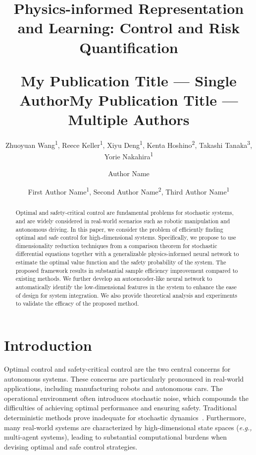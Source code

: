 \documentclass[letterpaper]{article} %
\title{



Physics-informed Representation and Learning: Control and Risk Quantification
}
\author{
    Zhuoyuan Wang\textsuperscript{\rm 1},
    Reece Keller\textsuperscript{\rm 1},
    Xiyu Deng\textsuperscript{\rm 1}, Kenta Hoshino\textsuperscript{\rm 2}, Takashi Tanaka\textsuperscript{\rm 3}, Yorie Nakahira\textsuperscript{\rm 1}
}
\title{My Publication Title --- Single Author}
\author {
    Author Name
}
\title{My Publication Title --- Multiple Authors}
\author {
    First Author Name\textsuperscript{\rm 1},
    Second Author Name\textsuperscript{\rm 2},
    Third Author Name\textsuperscript{\rm 1}
}
\newcommand{\eg}{\textit{e.g., }}
\begin{document}
\maketitle

\begin{abstract}
Optimal and safety-critical control are fundamental problems for stochastic systems, and are widely considered in real-world scenarios such as robotic manipulation and autonomous driving. In this paper, we consider the problem of efficiently finding optimal and safe control for high-dimensional systems. Specifically, we propose to use dimensionality reduction techniques from a comparison theorem for stochastic differential equations together with a generalizable physics-informed neural network to estimate the optimal value function and the safety probability of the system. The proposed framework results in substantial sample efficiency improvement compared to existing methods. We further develop an autoencoder-like neural network to automatically identify the low-dimensional features in the system to enhance the ease of design for system integration. We also provide theoretical analysis and experiments to validate the efficacy of the proposed method.

\end{abstract}

\section{Introduction}

Optimal control and safety-critical control are the two central concerns for autonomous systems.
These concerns are particularly pronounced in real-world applications, including manufacturing robots and autonomous cars.
The operational environment often introduces stochastic noise, which compounds the difficulties of achieving optimal performance and ensuring safety. Traditional deterministic methods prove inadequate for stochastic dynamics~\cite{katsoulakis2020data}.
Furthermore, many real-world systems are characterized by high-dimensional state spaces (\eg multi-agent systems), leading to substantial computational burdens when devising optimal and safe control strategies.
\end{document}
